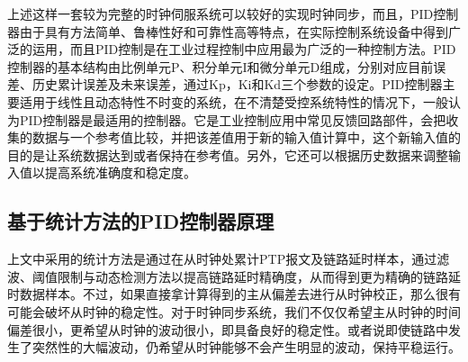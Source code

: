 上述这样一套较为完整的时钟伺服系统可以较好的实现时钟同步，而且，PID控制器由于具有方法简单、鲁棒性好和可靠性高等特点，在实际控制系统设备中得到广泛的运用，而且PID控制是在工业过程控制中应用最为广泛的一种控制方法。PID控制器的基本结构由比例单元P、积分单元I和微分单元D组成，分别对应目前误差、历史累计误差及未来误差，通过Kp，Ki和Kd三个参数的设定。PID控制器主要适用于线性且动态特性不时变的系统，在不清楚受控系统特性的情况下，一般认为PID控制器是最适用的控制器。它是工业控制应用中常见反馈回路部件，会把收集的数据与一个参考值比较，并把该差值用于新的输入值计算中，这个新输入值的目的是让系统数据达到或者保持在参考值。另外，它还可以根据历史数据来调整输入值以提高系统准确度和稳定度。

\subsection{基于统计方法的PID控制器原理}
上文中采用的统计方法是通过在从时钟处累计PTP报文及链路延时样本，通过滤波、阈值限制与动态检测方法以提高链路延时精确度，从而得到更为精确的链路延时数据样本。不过，如果直接拿计算得到的主从偏差去进行从时钟校正，那么很有可能会破坏从时钟的稳定性。对于时钟同步系统，我们不仅仅希望主从时钟的时间偏差很小，更希望从时钟的波动很小，即具备良好的稳定性。或者说即使链路中发生了突然性的大幅波动，仍希望从时钟能够不会产生明显的波动，保持平稳运行。

